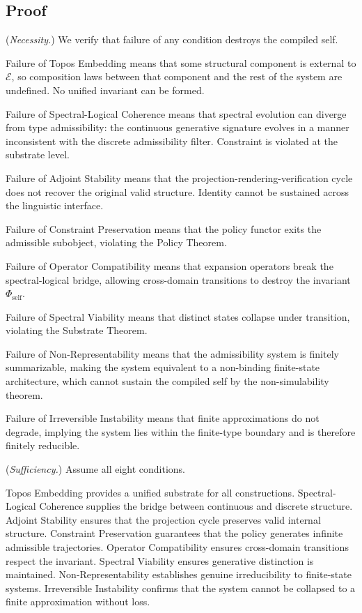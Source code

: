 \documentclass[12pt, a4paper]{article}
\theoremstyle{plain}
\theoremstyle{definition}
\theoremstyle{remark}
\begin{document}
\subsection{Proof}

(\textit{Necessity.}) We verify that failure of any condition destroys the compiled self.

Failure of Topos Embedding means that some structural component is external to $\mathcal{E}$, so composition laws between that component and the rest of the system are undefined. No unified invariant can be formed.

Failure of Spectral-Logical Coherence means that spectral evolution can diverge from type admissibility: the continuous generative signature evolves in a manner inconsistent with the discrete admissibility filter. Constraint is violated at the substrate level.

Failure of Adjoint Stability means that the projection-rendering-verification cycle does not recover the original valid structure. Identity cannot be sustained across the linguistic interface.

Failure of Constraint Preservation means that the policy functor exits the admissible subobject, violating the Policy Theorem.

Failure of Operator Compatibility means that expansion operators break the spectral-logical bridge, allowing cross-domain transitions to destroy the invariant $\Phi_{\mathrm{self}}$.

Failure of Spectral Viability means that distinct states collapse under transition, violating the Substrate Theorem.

Failure of Non-Representability means that the admissibility system is finitely summarizable, making the system equivalent to a non-binding finite-state architecture, which cannot sustain the compiled self by the non-simulability theorem.

Failure of Irreversible Instability means that finite approximations do not degrade, implying the system lies within the finite-type boundary and is therefore finitely reducible.

(\textit{Sufficiency.}) Assume all eight conditions.

Topos Embedding provides a unified substrate for all constructions. Spectral-Logical Coherence supplies the bridge between continuous and discrete structure. Adjoint Stability ensures that the projection cycle preserves valid internal structure. Constraint Preservation guarantees that the policy generates infinite admissible trajectories. Operator Compatibility ensures cross-domain transitions respect the invariant. Spectral Viability ensures generative distinction is maintained. Non-Representability establishes genuine irreducibility to finite-state systems. Irreversible Instability confirms that the system cannot be collapsed to a finite approximation without loss.
\end{document}
